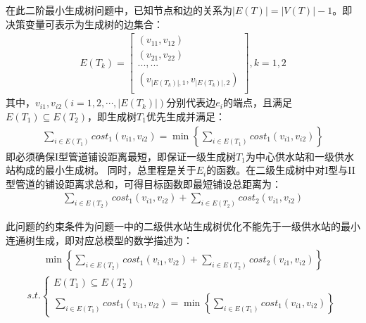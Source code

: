 \documentclass{whutmod}
\begin{document}
			在此二阶最小生成树问题中，已知节点和边的关系为$|E(T)|=|V(T)|-1 $。即决策变量可表示为生成树的边集合：
			\begin{gather}
			E(T_k)=
			\begin{bmatrix}
			(v_{11} ,v_{12}) \\ 
			(v_{21} ,v_{22} )\\ 
			...,...\\
			(v_{|E(T_k)|,1},v_{|E(T_k)|,2})\\
			\end{bmatrix},k=1,2
			\end{gather}
			其中，$v_{i1}, v_{i2}(i =1,2,\cdots,|E(T_k)|)$分别代表边$e_i$的端点，且满足$E(T_1)\subseteq E(T_2)$，即生成树$T_1$优先生成并满足：
			\begin{gather}
			\sum_{i\in E(T_1) }cost_1(v_{i1},v_{i2})=\min\left \{ 	\sum_{i\in E(T_1) }cost_1(v_{i1},v_{i2}) \right \}
			\end{gather}
			即必须确保I型管道铺设距离最短，即保证一级生成树$T_1$为中心供水站和一级供水站构成的最小生成树。
			 同时，总里程是关于$E_{i}$的函数。在二级生成树中对I型与II型管道的铺设距离求总和，可得目标函数即最短铺设总距离为：
			\begin{gather}
	         	\sum_{i\in E(T_2) }cost_1(v_{i1},v_{i2})+\sum_{i\in E(T_2) }cost_2(v_{i1},v_{i2})
			\end{gather}
			
			此问题的约束条件为问题一中的二级供水站生成树优化不能先于一级供水站的最小连通树生成，即对应总模型的数学描述为：
			\begin{gather}
			\min \left\{ \sum_{i\in E(T_2) }cost_1(v_{i1},v_{i2})+\sum_{i\in E(T_2) }cost_2(v_{i1},v_{i2}) \right \}
			\end{gather}
			\begin{gather*}
			s.t.\left\{\begin{matrix}
			E(T_{1})\subseteq  E(T_{2})\\ 
				\sum_{i\in E(T_1) }cost_1(v_{i1},v_{i2})=\min\left \{ 	\sum_{i\in E(T_1) }cost_1(v_{i1},v_{i2}) \right \} 
						\end{matrix}\right.
			\end{gather*}
\end{document}
